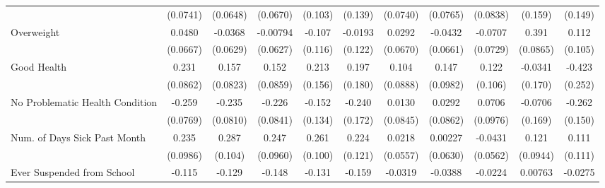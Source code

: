 {\begin{tabular}{l*{10}{c}}
            &    (0.0741)         &    (0.0648)         &    (0.0670)         &     (0.103)         &     (0.139)         &    (0.0740)         &    (0.0765)         &    (0.0838)         &     (0.159)         &     (0.149)         \\
\addlinespace
Overweight  &      0.0480         &     -0.0368         &    -0.00794         &      -0.107         &     -0.0193         &      0.0292         &     -0.0432         &     -0.0707         &       0.391\sym{***}&       0.112         \\
            &    (0.0667)         &    (0.0629)         &    (0.0627)         &     (0.116)         &     (0.122)         &    (0.0670)         &    (0.0661)         &    (0.0729)         &    (0.0865)         &     (0.105)         \\
\addlinespace
Good Health &       0.231\sym{**} &       0.157         &       0.152         &       0.213         &       0.197         &       0.104         &       0.147         &       0.122         &     -0.0341         &      -0.423         \\
            &    (0.0862)         &    (0.0823)         &    (0.0859)         &     (0.156)         &     (0.180)         &    (0.0888)         &    (0.0982)         &     (0.106)         &     (0.170)         &     (0.252)         \\
\addlinespace
No Problematic Health Condition&      -0.259\sym{***}&      -0.235\sym{**} &      -0.226\sym{**} &      -0.152         &      -0.240         &      0.0130         &      0.0292         &      0.0706         &     -0.0706         &      -0.262         \\
            &    (0.0769)         &    (0.0810)         &    (0.0841)         &     (0.134)         &     (0.172)         &    (0.0845)         &    (0.0862)         &    (0.0976)         &     (0.169)         &     (0.150)         \\
\addlinespace
Num. of Days Sick Past Month&       0.235\sym{*}  &       0.287\sym{**} &       0.247\sym{**} &       0.261\sym{**} &       0.224         &      0.0218         &     0.00227         &     -0.0431         &       0.121         &       0.111         \\
            &    (0.0986)         &     (0.104)         &    (0.0960)         &     (0.100)         &     (0.121)         &    (0.0557)         &    (0.0630)         &    (0.0562)         &    (0.0944)         &     (0.111)         \\
\addlinespace
Ever Suspended from School&      -0.115\sym{*}  &      -0.129\sym{*}  &      -0.148\sym{**} &      -0.131         &      -0.159         &     -0.0319         &     -0.0388         &     -0.0224         &     0.00763         &     -0.0275         \\

\end{tabular}}
